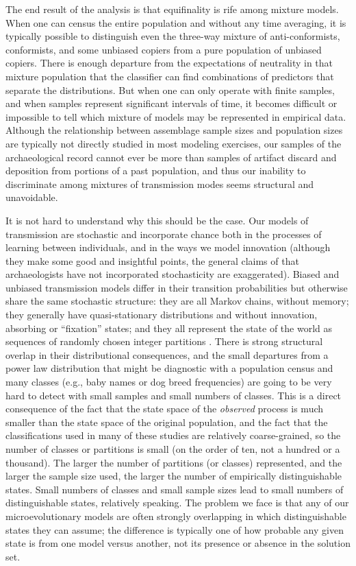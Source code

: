 The end result of the analysis is that equifinality is rife among mixture models.  When one can census the entire population and without any time averaging, it is typically possible to distinguish even the three-way mixture of anti-conformists, conformists, and some unbiased copiers from a pure population of unbiased copiers.  There is enough departure from the expectations of neutrality in that mixture population that the classifier can find combinations of predictors that separate the distributions.  But when one can only operate with finite samples, and when samples represent significant intervals of time, it becomes difficult or impossible to tell which mixture of models may be represented in empirical data.  Although the relationship between assemblage sample sizes and population sizes are typically not directly studied in most modeling exercises, our samples of the archaeological record cannot ever be more than samples of artifact discard and deposition from portions of a past population, and thus our inability to discriminate among mixtures of transmission modes seems structural and unavoidable.  

It is not hard to understand why this should be the case.  Our models of transmission are stochastic and incorporate chance both in the processes of learning between individuals, and in the ways we model innovation (although they make some good and insightful points, the general claims of \citealt{billiard2018stochasticity} that archaeologists have not incorporated stochasticity are exaggerated).  Biased and unbiased transmission models differ in their transition probabilities but otherwise share the same stochastic structure:  they are all Markov chains, without memory; they generally have quasi-stationary distributions and without innovation, absorbing or ``fixation'' states; and they all represent the state of the world as sequences of randomly chosen integer partitions \citep{crane2016ubiquitous}.  There is strong structural overlap in their distributional consequences, and the small departures from a power law distribution that might be diagnostic with a population census and many classes (e.g., baby names or dog breed frequencies) are going to be very hard to detect with small samples and small numbers of classes.  This is a direct consequence of the fact that the state space of the \emph{observed} process is much smaller than the state space of the original population, and the fact that the classifications used in many of these studies are relatively coarse-grained, so the number of classes or partitions is small (on the order of ten, not a hundred or a thousand).   The larger the number of partitions (or classes) represented, and the larger the sample size used, the larger the number of empirically distinguishable states.  Small numbers of classes and small sample sizes lead to small numbers of distinguishable states, relatively speaking.  The problem we face is that any of our microevolutionary models are often strongly overlapping in which distinguishable states they can assume; the difference is typically one of how probable any given state is from one model versus another, not its presence or absence in the solution set.  

